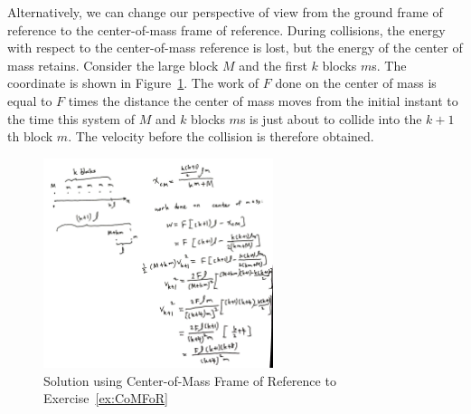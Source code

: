 \documentclass[a4paper,12pt,titlepage]{article}
\begin{document}
Alternatively, we can change our perspective of view from the ground frame of reference to the center-of-mass frame of reference. During collisions, the energy with respect to the center-of-mass reference is lost, but the energy of the center of mass retains. Consider the large block $M$ and the first $k$ blocks $m$s. The coordinate is shown in Figure~\ref{fig:mycenterofmassforsol}. The work of $F$ done on the center of mass is equal to $F$ times the distance the center of mass moves from the initial instant to the time this system of $M$ and $k$ blocks $m$s is just about to collide into the $k+1$th block $m$. The velocity before the collision is therefore obtained.
\begin{figure}[h]
\centering
\includegraphics[width=0.6\textwidth]{Midterm2ReviewHandout_CoMFoRSol.JPG}
\caption{Solution using Center-of-Mass Frame of Reference to Exercise~\ref{ex:CoMFoR}\label{fig:mycenterofmassforsol}}
\end{figure}
\end{document}
